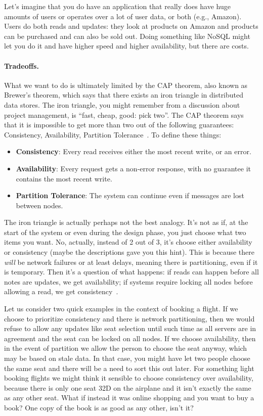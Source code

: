 Let's imagine that you do have an application that really does have huge amounts of users or operates over a lot of user data, or both (e.g., Amazon). Users do both reads and updates: they look at products on Amazon and products can be purchased and can also be sold out. Doing something like NoSQL might let you do it and have higher speed and higher availability, but there are costs. 

\paragraph{Tradeoffs.} What we want to do is ultimately limited by the CAP theorem, also known as Brewer's theorem, which says that there exists an iron triangle in distributed data stores. The iron triangle, you might remember from a discussion about project management, is ``fast, cheap, good: pick two''. The CAP theorem says that it is impossible to get more than two out of the following guarantees: Consistency, Availability, Partition Tolerance~\cite{brewercap}. To define these things:

\begin{itemize}
	\item \textbf{Consistency}: Every read receives either the most recent write, or an error.
	\item \textbf{Availability}: Every request gets a non-error response, with no guarantee it contains the most recent write.
	\item \textbf{Partition Tolerance}: The system can continue even if messages are lost between nodes.
\end{itemize}

The iron triangle is actually perhaps not the best analogy. It's not as if, at the start of the system or even during the design phase, you just choose what two items you want. No, actually, instead of 2 out of 3, it's choose either availability or consistency (maybe the descriptions gave you this hint). This is because there \textit{will} be network failures or at least delays, meaning there is partitioning, even if it is temporary. Then it's a question of what happens: if reads can happen before all notes are updates, we get availability; if systems require locking all nodes before allowing a read, we get consistency~\cite{bettercap}.

Let us consider two quick examples in the context of booking a flight. If we choose to prioritize consistency and there is network partitioning, then we would refuse to allow any updates like seat selection until such time as all servers are in agreement and the seat can be locked on all nodes. If we choose availability, then in the event of partition we allow the person to choose the seat anyway, which may be based on stale data. In that case, you might have let two people choose the same seat and there will be a need to sort this out later. For something light booking flights we might think it sensible to choose consistency over availability, because there is only one seat 32D on the airplane and it isn't exactly the same as any other seat. What if instead it was online shopping and you want to buy a book? One copy of the book is as good as any other, isn't it?

